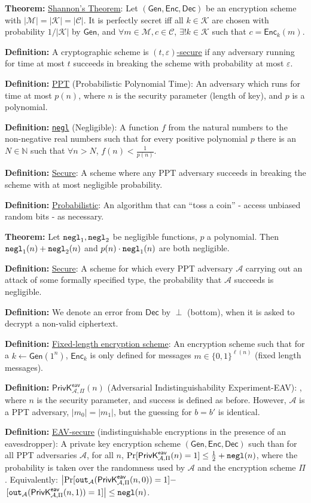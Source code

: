 \documentclass[10pt]{article}
\newcommand{\N}{\mathbb{N}}
\newcommand{\AAA}{\mathcal{A}}
\newcommand{\CCC}{\mathcal{C}}
\newcommand{\KKK}{\mathcal{K}}
\newcommand{\MMM}{\mathcal{M}}
\newcommand{\defn}[1]{{\bf Definition:} \underline{#1}}
\newcommand{\thm}[1]{{\bf Theorem:} \underline{#1}}
\newcommand{\Enc}{\mathsf{Enc}}
\newcommand{\Dec}{\mathsf{Dec}}
\newcommand{\Gen}{\mathsf{Gen}}
\newcommand{\GenEncDec}{(\Gen,\Enc,\Dec)}
\newcommand{\ExptEavArgs}[2]{\mathsf{PrivK}^{\mathsf{eav}}_{#1,#2}}
\newcommand{\ExptEav}{\ExptEavArgs{\AAA}{\Pi}}
\newcommand{\negl}{{\tt negl}}
\newcommand{\from}{\leftarrow}
\begin{document}
\begin{multicols}{3}
\thm{Shannon's Theorem}: Let $\GenEncDec$ be an encryption scheme with $|\MMM|=|\KKK|=|\CCC|$. It is perfectly secret iff all $k\in\KKK$ are chosen with probability $1/|\KKK|$ by $\Gen$, and $\forall m\in\MMM, c\in\CCC$, $\exists!k\in\KKK$ such that $c=\Enc_k(m)$.

\defn{}A cryptographic scheme is \underline{$(t,\varepsilon)$-secure} if any adversary running for time at most $t$ succeeds in breaking the scheme with probability at most $\varepsilon$.

\defn{PPT} (Probabilistic Polynomial Time): An adversary which runs for time at most $p(n)$, where $n$ is the security parameter (length of key), and $p$ is a polynomial.

\defn{\negl} (Negligible): A function $f$ from the natural numbers to the non-negative real numbers such that for every positive polynomial $p$ there is an $N\in\N$ such that $\forall n>N$, $f(n)<\frac{1}{p(n)}$.

\defn{Secure}: A scheme where any PPT adversary succeeds in breaking the scheme with at most negligible probability.

\defn{Probabilistic}: An algorithm that can ``toss a coin'' - access unbiased random bits - as necessary.

\thm{}Let $\negl_1,\negl_2$ be negligible functions, $p$ a polynomial. Then $\negl_1(n)+\negl_2(n)$ and $p(n)\cdot\negl_1(n)$ are both negligible.

\defn{Secure}: A scheme for which every PPT adversary $\AAA$ carrying out an attack of some formally specified type, the probability that $\AAA$ succeeds is negligible.

\defn{}We denote an error from $\Dec$ by $\perp$ (bottom), when it is asked to decrypt a non-valid ciphertext.

\defn{Fixed-length encryption scheme}: An encryption scheme such that for a $k\from\Gen(1^n)$, $\Enc_k$ is only defined for messages $m\in\{0,1\}^{\ell(n)}$ (fixed length messages).

\defn{$\ExptEav(n)$} (Adversarial Indistinguishability Experiment-EAV): , where $n$ is the security parameter, and success is defined as before. However, $\AAA$ is a PPT adversary, $|m_0|=|m_1|$, but the guessing for $b=b'$ is identical.

\defn{EAV-secure} (indistinguishable encryptions in the presence of an eavesdropper): A private key encryption scheme $\GenEncDec$ such than for all PPT adversaries $\AAA$, for all $n$, $\Pr[\ExptEav(n)=1]\leq\frac{1}{2}+\negl(n)$, where the probability is taken over the randomness used by $\AAA$ and the encryption scheme $\Pi$. Equivalently: $\left|\Pr[{\tt out}_{\AAA}(\ExptEav(n,0))=1]-\right.$ $\left.[{\tt out}_{\AAA}(\ExptEav(n,1))=1]\right|\leq\negl(n)$.


\end{multicols}
\end{document}
